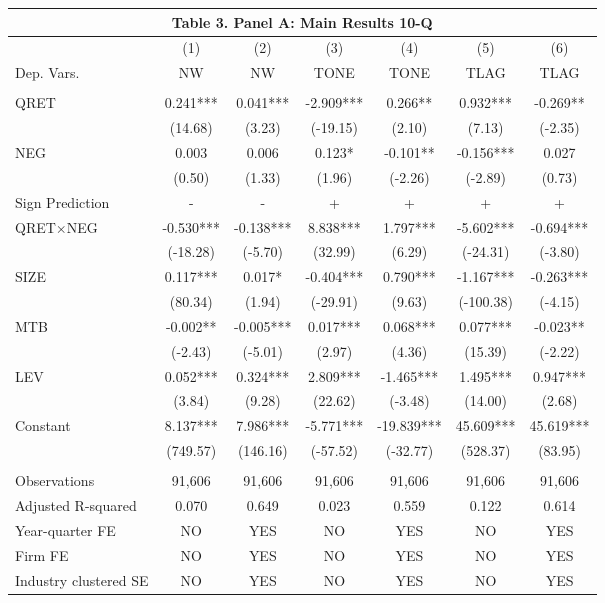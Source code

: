 \begin{table}[htbp] \label{T3PA}
  \centering
    \begin{tabular}{lcccccc}
    \multicolumn{7}{c}{\textbf{Table 3. Panel A: Main Results 10-Q}} \\
    \midrule
    \midrule
      & (1) & (2) & (3) & (4) & (5) & (6) \\
    Dep. Vars. & NW & NW & TONE & TONE & TLAG & TLAG \\
    \midrule
      &   &   &   &   &   &  \\
    QRET & 0.241*** & 0.041*** & -2.909*** & 0.266** & 0.932*** & -0.269** \\
      & (14.68) & (3.23) & (-19.15) & (2.10) & (7.13) & (-2.35) \\
    NEG & 0.003 & 0.006 & 0.123* & -0.101** & -0.156*** & 0.027 \\
      & (0.50) & (1.33) & (1.96) & (-2.26) & (-2.89) & (0.73) \\
    \rowcolor[rgb]{ .933,  .925,  .882} Sign Prediction & - & - & + & + & + & + \\
    \rowcolor[rgb]{ .933,  .925,  .882} QRET$\times$NEG & -0.530*** & -0.138*** & 8.838*** & 1.797*** & -5.602*** & -0.694*** \\
    \rowcolor[rgb]{ .933,  .925,  .882}   & (-18.28) & (-5.70) & (32.99) & (6.29) & (-24.31) & (-3.80) \\
    SIZE & 0.117*** & 0.017* & -0.404*** & 0.790*** & -1.167*** & -0.263*** \\
      & (80.34) & (1.94) & (-29.91) & (9.63) & (-100.38) & (-4.15) \\
    MTB & -0.002** & -0.005*** & 0.017*** & 0.068*** & 0.077*** & -0.023** \\
      & (-2.43) & (-5.01) & (2.97) & (4.36) & (15.39) & (-2.22) \\
    LEV & 0.052*** & 0.324*** & 2.809*** & -1.465*** & 1.495*** & 0.947*** \\
      & (3.84) & (9.28) & (22.62) & (-3.48) & (14.00) & (2.68) \\
    Constant & 8.137*** & 7.986*** & -5.771*** & -19.839*** & 45.609*** & 45.619*** \\
      & (749.57) & (146.16) & (-57.52) & (-32.77) & (528.37) & (83.95) \\
      &   &   &   &   &   &  \\
    Observations & 91,606 & 91,606 & 91,606 & 91,606 & 91,606 & 91,606 \\
    Adjusted R-squared & 0.070 & 0.649 & 0.023 & 0.559 & 0.122 & 0.614 \\
    Year-quarter FE & NO & YES & NO & YES & NO & YES \\
    Firm FE & NO & YES & NO & YES & NO & YES \\
    Industry clustered SE & NO & YES & NO & YES & NO & YES \\
    \bottomrule
    \bottomrule
    \end{tabular}%
\end{table}%
